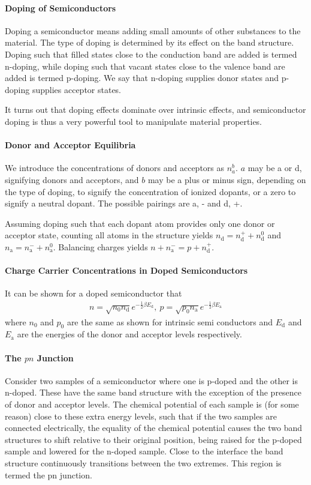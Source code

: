 \paragraph{Doping of Semiconductors}
Doping a semiconductor means adding small amounts of other substances to the material. The type of doping is determined by its effect on the band structure. Doping such that filled states close to the conduction band are added is termed n-doping, while doping such that vacant states close to the valence band are added is termed p-doping. We say that n-doping supplies donor states and p-doping supplies acceptor states.

It turns out that doping effects dominate over intrinsic effects, and semiconductor doping is thus a very powerful tool to manipulate material properties.

\paragraph{Donor and Acceptor Equilibria}
We introduce the concentrations of donors and acceptors as $n_{a}^{b}$. $a$ may be a or d, signifying donors and acceptors, and $b$ may be a plus or minus sign, depending on the type of doping, to signify the concentration of ionized dopants, or a zero to signify a neutral dopant. The possible pairings are a, - and d, +.

Assuming doping such that each dopant atom provides only one donor or acceptor state, counting all atoms in the structure yields $n_{\text{d}} = n_{\text{d}}^{+} + n_{\text{d}}^{0}$ and $n_{\text{a}} = n_{\text{a}}^{-} + n_{\text{a}}^{0}$. Balancing charges yields $n + n_{\text{a}}^{-} = p + n_{\text{d}}^{+}$.

\paragraph{Charge Carrier Concentrations in Doped Semiconductors}
It can be shown for a doped semiconductor that
\begin{align*}
	n = \sqrt{n_{0}n_{\text{d}}}e^{-\frac{1}{2}\beta E_{\text{d}}},\ p = \sqrt{p_{0}n_{\text{a}}}e^{-\frac{1}{2}\beta E_{\text{a}}}
\end{align*}
where $n_{0}$ and $p_{0}$ are the same as shown for intrinsic semi conductors and $E_{\text{d}}$ and $E_{\text{a}}$ are the energies of the donor and acceptor levels respectively.

\paragraph{The $pn$ Junction}
Consider two samples of a semiconductor where one is p-doped and the other is n-doped. These have the same band structure with the exception of the presence of donor and acceptor levels. The chemical potential of each sample is (for some reason) close to these extra energy levels, such that if the two samples are connected electrically, the equality of the chemical potential causes the two band structures to shift relative to their original position, being raised for the p-doped sample and lowered for the n-doped sample. Close to the interface the band structure continuously transitions between the two extremes. This region is termed the pn junction.

